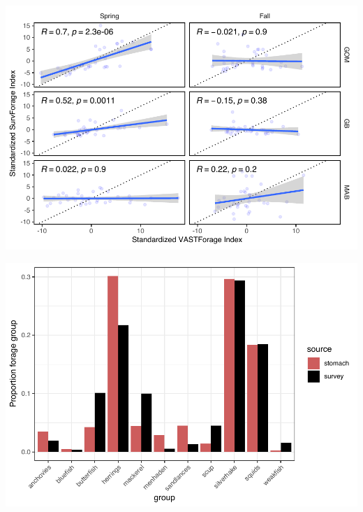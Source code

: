 \documentclass[
]{article}
\let\origfigure\figure
\let\endorigfigure\endfigure
\renewenvironment{figure}[1][2] {
    \expandafter\origfigure\expandafter[H]
} {
    \endorigfigure
}
\begin{document}
\begin{figure}
\centering
\includegraphics{Bluefish_forageindex_CJFAS_files/figure-latex/corr-1.pdf}
\caption{\label{fig:corr}VAST stomach contents based forage index (VASTForage) compared with survey based index (SurvForage) by season and region (GOM = Gulf of Maine, GB = Georges Bank, MAB = Mid Atlantic Bight). Pearson correlation coefficients (\emph{R}) and correlation significance (\emph{p}) are shown for each season/region.}
\end{figure}

\begin{figure}
\centering
\includegraphics{Bluefish_forageindex_CJFAS_files/figure-latex/sppprop-1.pdf}
\caption{\label{fig:sppprop}Comparison of raw proportional species composition from all predator stomachs combined (source = stomach, red) to the raw proportional species composition from bottom trawl survey sampling (source = survey, black) in the model domain forall regions and seasons from 1985-2021.}
\end{figure}
\end{document}

